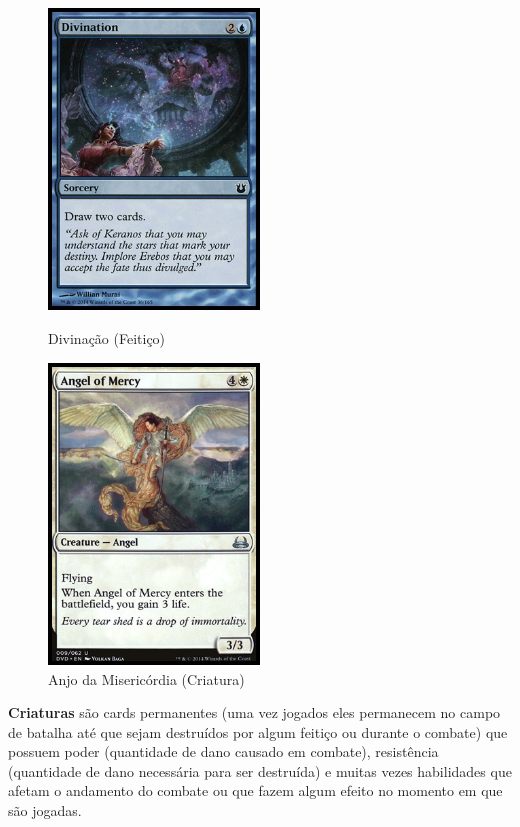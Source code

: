 \documentclass{book}
\begin{document}
\begin{figure}[!h]
    \centering
    \begin{minipage}{0.45\textwidth}
        \centering
        \includegraphics[width=0.5\textwidth]{picstcc/divination.jpg}
        \caption{Divinação (Feitiço)}
        \label{divination}
    \end{minipage}\hfill
    \begin{minipage}{0.45\textwidth}
        \centering
        \includegraphics[width=0.5\textwidth]{picstcc/angelOfMercy.jpg}
        \caption{Anjo da Misericórdia (Criatura)}
        \label{anjo}
    \end{minipage}
\end{figure}

\textbf{Criaturas} são cards permanentes (uma vez jogados eles
permanecem no campo de batalha até que sejam destruídos por algum
feitiço ou durante o combate) que possuem poder (quantidade de dano
causado em combate), resistência (quantidade de dano necessária para ser
destruída) e muitas vezes habilidades que afetam o andamento do combate
ou que fazem algum efeito no momento em que são jogadas.
\end{document}
